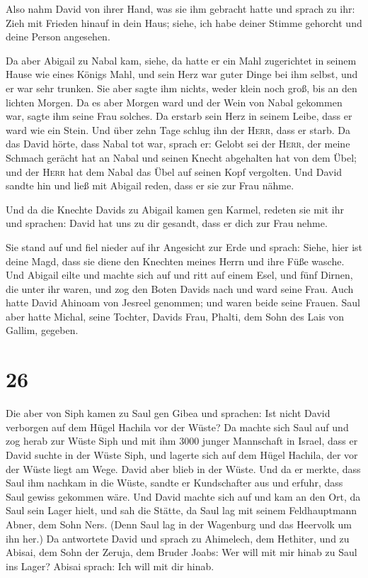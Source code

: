  Also nahm David von ihrer Hand, was sie ihm gebracht
hatte und sprach zu ihr: Zieh mit Frieden hinauf in dein Haus; siehe,
ich habe deiner Stimme gehorcht und deine Person angesehen.

 Da aber Abigail zu Nabal kam, siehe, da hatte er ein
Mahl zugerichtet in seinem Hause wie eines Königs Mahl, und sein Herz
war guter Dinge bei ihm selbst, und er war sehr trunken. Sie aber sagte
ihm nichts, weder klein noch groß, bis an den lichten Morgen.
 Da es aber Morgen ward und der Wein von Nabal gekommen
war, sagte ihm seine Frau solches. Da erstarb sein Herz in seinem Leibe,
dass er ward wie ein Stein.  Und über zehn Tage schlug
ihn der \textsc{Herr}, dass er starb.  Da das David
hörte, dass Nabal tot war, sprach er: Gelobt sei der \textsc{Herr}, der
meine Schmach gerächt hat an Nabal und seinen Knecht abgehalten hat von
dem Übel; und der \textsc{Herr} hat dem Nabal das Übel auf seinen Kopf
vergolten. Und David sandte hin und ließ mit Abigail reden, dass er sie
zur Frau nähme.

 Und da die Knechte Davids zu Abigail kamen gen Karmel,
redeten sie mit ihr und sprachen: David hat uns zu dir gesandt, dass er
dich zur Frau nehme.

 Sie stand auf und fiel nieder auf ihr Angesicht zur Erde
und sprach: Siehe, hier ist deine Magd, dass sie diene den Knechten
meines Herrn und ihre Füße wasche.  Und Abigail eilte und
machte sich auf und ritt auf einem Esel, und fünf Dirnen, die unter ihr
waren, und zog den Boten Davids nach und ward seine Frau.
 Auch hatte David Ahinoam von Jesreel genommen; und waren
beide seine Frauen.  Saul aber hatte Michal, seine
Tochter, Davids Frau, Phalti, dem Sohn des Lais von Gallim, gegeben.

\hypertarget{section-25}{%
\section{26}\label{section-25}}

 Die aber von Siph kamen zu Saul gen Gibea und sprachen:
Ist nicht David verborgen auf dem Hügel Hachila vor der Wüste?
 Da machte sich Saul auf und zog herab zur Wüste Siph und
mit ihm 3000 junger Mannschaft in Israel, dass er David suchte in der
Wüste Siph,  und lagerte sich auf dem Hügel Hachila, der
vor der Wüste liegt am Wege. David aber blieb in der Wüste. Und da er
merkte, dass Saul ihm nachkam in die Wüste,  sandte er
Kundschafter aus und erfuhr, dass Saul gewiss gekommen wäre.
 Und David machte sich auf und kam an den Ort, da Saul
sein Lager hielt, und sah die Stätte, da Saul lag mit seinem
Feldhauptmann Abner, dem Sohn Ners. (Denn Saul lag in der Wagenburg und
das Heervolk um ihn her.)  Da antwortete David und sprach
zu Ahimelech, dem Hethiter, und zu Abisai, dem Sohn der Zeruja, dem
Bruder Joabs: Wer will mit mir hinab zu Saul ins Lager? Abisai sprach:
Ich will mit dir hinab.

